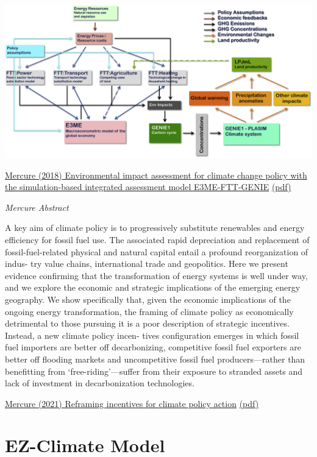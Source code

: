 \documentclass[
]{book}
\begin{document}
\includegraphics{fig/E3E-FTT-GENIE.png}

\href{https://www.sciencedirect.com/science/article/pii/S2211467X18300129?via\%3Dihub}{Mercure (2018) Environmental impact assessment for climate change policy with the simulation-based integrated assessment model E3ME-FTT-GENIE}
\href{pdf/Mercure_2018_E3ME-FTT-GENIE.pdf}{(pdf)}

\emph{Mercure Abstract}

A key aim of climate policy is to progressively substitute renewables and energy efficiency for fossil fuel use. The associated
rapid depreciation and replacement of fossil-fuel-related physical and natural capital entail a profound reorganization of indus-
try value chains, international trade and geopolitics. Here we present evidence confirming that the transformation of energy
systems is well under way, and we explore the economic and strategic implications of the emerging energy geography. We
show specifically that, given the economic implications of the ongoing energy transformation, the framing of climate policy as
economically detrimental to those pursuing it is a poor description of strategic incentives. Instead, a new climate policy incen-
tives configuration emerges in which fossil fuel importers are better off decarbonizing, competitive fossil fuel exporters are
better off flooding markets and uncompetitive fossil fuel producers---rather than benefitting from `free-riding'---suffer from
their exposure to stranded assets and lack of investment in decarbonization technologies.

\href{https://www.nature.com/articles/s41560-021-00934-2}{Mercure (2021) Reframing incentives for climate policy action}
\href{pdf/Mercure_2021_Reframing_incentives_for_Climate_Policy_Action.pdf}{(pdf)}

\hypertarget{ez-climate-model}{%
\section{EZ-Climate Model}\label{ez-climate-model}}
\end{document}
